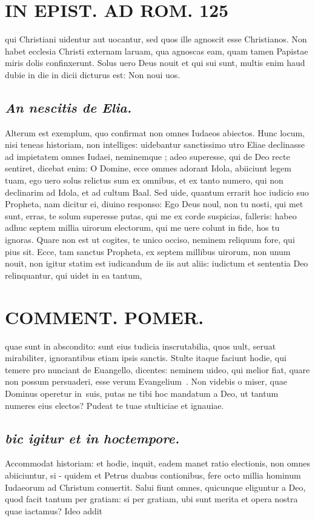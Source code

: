 \documentclass{article}
\begin{document}
\begin{pages}
\section*{IN EPIST. AD ROM.  125 }
\marginpar{[ p.]}\pstart qui Christiani uidentur aut uocantur, sed quos ille agnoscit esse Christianos. Non habet ecclesia Christi externam laruam, qua agnoscas eam, quam tamen Papistae miris dolis confinxerunt. Solus uero Deus nouit et qui sui sunt, multis enim haud dubie in die in dicii dicturus est: Non noui uos.  \pend
{}
{}
\subsection*{\textit{An nescitis de Elia. }}\pstart Alterum est exemplum, quo confirmat non omnes Iudaeos abiectos. Hunc locum, nisi teneas historiam, non intelliges: uidebantur sanctissimo utro Eliae declinasse ad impietatem omnes Iudaei, neminemque ; adeo superesse, qui de Deo recte sentiret, dicebat enim: O Domine, ecce ommes adorant Idola, abiiciunt legem tuam, ego uero solus relictus sum ex omnibus, et ex tanto numero, qui non declinarim ad Idola, et ad cultum Baal. Sed uide, quantum errarit hoc iudicio suo Propheta, nam dicitur ei, diuino responso: Ego Deus noul, non tu nosti, qui met sunt, erras, te solum superesse putas, qui me ex corde suspicias, falleris: habeo adhuc septem millia uirorum electorum, qui me uere colunt in fide, hos tu ignoras. Quare non est ut cogites, te unico occiso, neminem reliquum fore, qui pius sit. Ecce, tam sanctus Propheta, ex septem millibus uirorum, non unum nouit, non igitur statim est iudicandum de iis aut aliis: iudictum et sententia Deo relinquantur, qui uidet in ea tantum,  \pend
\section*{COMMENT. POMER.  }\pstart quae sunt in abscondito: sunt eius tudicia inscrutabilia, quos uult, seruat mirabiliter, ignorantibus etiam ipsis sanctis. Stulte itaque faciunt hodie, qui temere pro nunciant de Euangello, dicentes: neminem uideo, qui melior fiat, quare non possum persuaderi, esse verum Evangelium . Non videbis o miser, quae Dominus operetur in suis, putas ne tibi hoc mandatum a Deo, ut tantum numeres eius electos? Pudeat te tuae stulticiae et ignauiae.  \pend
{}
{}
\subsection*{\textit{bic igitur et in hoctempore. }}\pstart Accommodat historiam: et hodie, inquit, eadem manet ratio electionis, non omnes abiiciuntur, si - quidem et Petrus duabus contionibus, fere octo millia hominum Iudaeorum ad Christum conuertit. Salui fiunt omnes, quicunque eliguntur a Deo, quod facit tantum per gratiam: si per gratiam, ubi sunt merita et opera nostra quae iactamus? Ideo addit  \pend
{}
{}

\end{pages}
\end{document}
